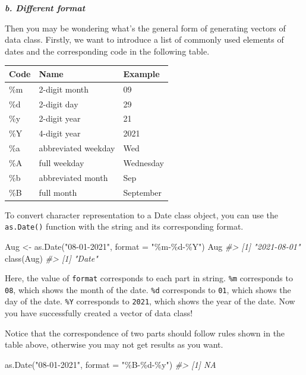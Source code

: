 \documentclass[
]{book}
\newenvironment{Shaded}{\begin{snugshade}}{\end{snugshade}}
\newcommand{\AttributeTok}[1]{\textcolor[rgb]{0.77,0.63,0.00}{#1}}
\newcommand{\CommentTok}[1]{\textcolor[rgb]{0.56,0.35,0.01}{\textit{#1}}}
\newcommand{\FunctionTok}[1]{\textcolor[rgb]{0.00,0.00,0.00}{#1}}
\newcommand{\NormalTok}[1]{#1}
\newcommand{\OtherTok}[1]{\textcolor[rgb]{0.56,0.35,0.01}{#1}}
\newcommand{\StringTok}[1]{\textcolor[rgb]{0.31,0.60,0.02}{#1}}
\begin{document}
\textbf{\emph{b. Different format}}

Then you may be wondering what's the general form of generating vectors of data class. Firstly, we want to introduce a list of commonly used elements of dates and the corresponding code in the following table.

\begin{tabular}{l|l|l}
\hline
Code & Name & Example\\
\hline
\%m & 2-digit month & 09\\
\hline
\%d & 2-digit day & 29\\
\hline
\%y & 2-digit year & 21\\
\hline
\%Y & 4-digit year & 2021\\
\hline
\%a & abbreviated weekday & Wed\\
\hline
\%A & full weekday & Wednesday\\
\hline
\%b & abbreviated month & Sep\\
\hline
\%B & full month & September\\
\hline
\end{tabular}

To convert character representation to a Date class object, you can use the \texttt{as.Date()} function with the string and its corresponding format.

\begin{Shaded}
\begin{Highlighting}[]
\NormalTok{Aug }\OtherTok{\textless{}{-}} \FunctionTok{as.Date}\NormalTok{(}\StringTok{"08{-}01{-}2021"}\NormalTok{, }\AttributeTok{format =} \StringTok{"\%m{-}\%d{-}\%Y"}\NormalTok{)}
\NormalTok{Aug}
\CommentTok{\#\textgreater{} [1] "2021{-}08{-}01"}
\FunctionTok{class}\NormalTok{(Aug)}
\CommentTok{\#\textgreater{} [1] "Date"}
\end{Highlighting}
\end{Shaded}

Here, the value of \texttt{format} corresponds to each part in string. \texttt{\%m} corresponds to \texttt{08}, which shows the month of the date. \texttt{\%d} corresponds to \texttt{01}, which shows the day of the date. \texttt{\%Y} corresponds to \texttt{2021}, which shows the year of the date. Now you have successfully created a vector of data class!

Notice that the correspondence of two parts should follow rules shown in the table above, otherwise you may not get results as you want.

\begin{Shaded}
\begin{Highlighting}[]
\FunctionTok{as.Date}\NormalTok{(}\StringTok{"08{-}01{-}2021"}\NormalTok{, }\AttributeTok{format =} \StringTok{"\%B{-}\%d{-}\%y"}\NormalTok{)}
\CommentTok{\#\textgreater{} [1] NA}
\end{Highlighting}
\end{Shaded}
\end{document}
